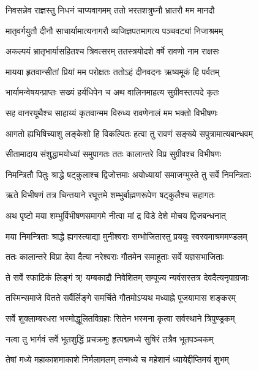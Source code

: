 \twolineshloka
{निवसन्नेव राज्ञस्तु निधनं चाप्यवागमम्}
{ततो भरतशत्रुघ्नौ भ्रातरौ मम मानदौ}%

\twolineshloka
{मातृवर्गयुतौ दीनौ साचार्यामात्यनागरौ}
{व्यजिज्ञपतमागत्य पञ्चवट्यां निजाश्रमम्}%

\twolineshloka
{अकल्पयं भ्रातृभार्यासहितश्च त्रिवत्सरम्}
{ततस्त्रयोदशे वर्षे रावणो नाम राक्षसः}%

\twolineshloka
{मायया हृतवान्सीतां प्रियां मम परोक्षतः}
{ततोऽहं दीनवदनः ऋष्यमूकं हि पर्वतम्}%

\twolineshloka
{भार्यामन्वेषयन्प्राप्तः सख्यं हर्यधिपेन च}
{अथ वालिनमाहत्य सुग्रीवस्तत्पदे कृतः}%

\twolineshloka
{सह वानरयूथैश्च साहाय्यं कृतवान्मम}
{विरुध्य रावणेनालं मम भक्तो विभीषणः}%

\twolineshloka
{आगतो ह्यभिषिच्याशु लङ्केशो हि विकल्पितः}
{हत्वा तु रावणं सङ्ख्ये सपुत्रामात्यबान्धवम्}%

\twolineshloka
{सीतामादाय संशुद्धामयोध्यां समुपागतः}
{ततः कालान्तरे विप्र सुग्रीवश्च विभीषणः}%

\twolineshloka
{निमन्त्रितौ पितुः श्राद्धे षट्कुलाश्च द्विजोत्तमाः}
{अयोध्यायां समाजग्मुस्ते तु सर्वे निमन्त्रिताः}%

\twolineshloka
{ऋते विभीषणं तत्र चिन्तयाने रघूत्तमे}
{शम्भुर्बाह्मणरूपेण षट्कुलैश्च सहागतः}%

\twolineshloka
{अथ पृष्टो मया शम्भुर्विभीषणसमागमे}
{नीत्वा मां द्र विडे देशे मोचय द्विजबन्धनात्}%

\twolineshloka
{मया निमन्त्रिताः श्राद्धे ह्यगस्त्याद्या मुनीश्वराः}
{सम्भोजितास्तु प्रययुः स्वस्वमाश्रममण्डलम्}%

\twolineshloka
{ततः कालान्तरे विप्रा देवा दैत्या नरेश्वराः}
{गौतमेन समाहूताः सर्वे यज्ञसभाजिताः}%

\twolineshloka
{ते सर्वे स्फाटिकं लिङ्गं त्र्! यम्बकाद्रौ निवेशितम्}
{सम्पूज्य न्यवंसस्तत्र देवदैत्यनृपाग्रजाः}%

\twolineshloka
{तस्मिन्समाजे वितते सर्वैर्लिङ्गे समर्चिते}
{गौतमोऽप्यथ मध्याह्ने पूजयामास शङ्करम्}%

\twolineshloka
{सर्वे शुक्लाम्बरधरा भस्मोद्धूलितविग्रहाः}
{सितेन भस्मना कृत्वा सर्वस्थाने त्रिपुण्ड्रकम्}%

\twolineshloka
{नत्वा तु भार्गवं सर्वे भूतशुद्धिं प्रचक्रमुः}
{हृत्पद्ममध्ये सुषिरं तत्रैव भूतपञ्चकम्}%

\twolineshloka
{तेषां मध्ये महाकाशमाकाशे निर्मलामलम्}
{तन्मध्ये च महेशानं ध्यायेद्दीप्तिमयं शुभम्}%

